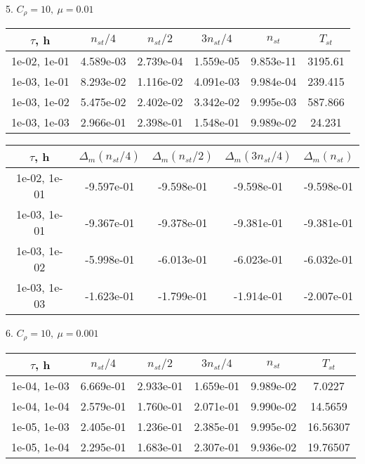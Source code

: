 5. $C_{\rho} = 10, \ \mu = 0.01$
\begin{center}
	\begin{tabular}{ |c|c|c|c|c|c| } 
		\hline
		$\tau$, h & $n_{st}/ 4$ & $n_{st}/ 2$ & $3n_{st}/ 4$ & $n_{st}$ & $T_{st}$ \\ 
		\hline
		1e-02, 1e-01 & 4.589e-03 & 2.739e-04 & 1.559e-05 & 9.853e-11 & 3195.61\\ 
		\hline
		1e-03, 1e-01 & 8.293e-02 & 1.116e-02 & 4.091e-03 & 9.984e-04 & 239.415\\ 
		\hline
		1e-03, 1e-02 & 5.475e-02 & 2.402e-02 & 3.342e-02 & 9.995e-03 & 587.866\\ 
		\hline
		1e-03, 1e-03 & 2.966e-01 & 2.398e-01 & 1.548e-01 & 9.989e-02 & 24.231\\ 
		\hline
	\end{tabular}
\end{center}

\begin{center}
	\begin{tabular}{ |c|c|c|c|c| } 
		\hline
		$\tau$, h & $\Delta_m (n_{st}/ 4)$ & $\Delta_m (n_{st}/ 2)$ & $\Delta_m (3n_{st}/ 4)$ & $\Delta_m (n_{st})$ \\ 
		\hline
		1e-02, 1e-01 & -9.597e-01 & -9.598e-01 & -9.598e-01 & -9.598e-01 \\ 
		\hline
		1e-03, 1e-01 & -9.367e-01 & -9.378e-01 & -9.381e-01 & -9.381e-01 \\ 
		\hline
		1e-03, 1e-02 & -5.998e-01 & -6.013e-01 & -6.023e-01 & -6.032e-01 \\ 
		\hline
		1e-03, 1e-03 & -1.623e-01 & -1.799e-01 & -1.914e-01 & -2.007e-01 \\ 
		\hline
	\end{tabular}
\end{center}

6. $C_{\rho} = 10, \ \mu = 0.001$
\begin{center}
	\begin{tabular}{ |c|c|c|c|c|c| } 
		\hline
		$\tau$, h & $n_{st}/ 4$ & $n_{st}/ 2$ & $3n_{st}/ 4$ & $n_{st}$ & $T_{st}$ \\ 
		\hline
		1e-04, 1e-03 & 6.669e-01 & 2.933e-01 & 1.659e-01 & 9.989e-02 & 7.0227\\ 
		\hline
		1e-04, 1e-04 & 2.579e-01 & 1.760e-01 & 2.071e-01 & 9.990e-02 & 14.5659\\ 
		\hline
		1e-05, 1e-03 & 2.405e-01 & 1.236e-01 & 2.385e-01 & 9.995e-02 & 16.56307\\ 
		\hline
		1e-05, 1e-04 & 2.295e-01 & 1.683e-01 & 2.307e-01 & 9.936e-02 & 19.76507\\ 
		\hline
	\end{tabular}
\end{center}

